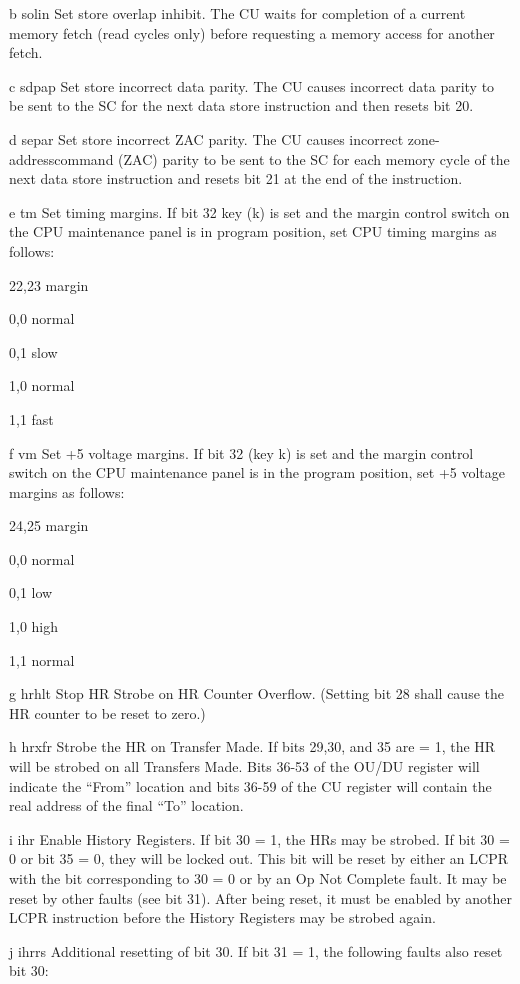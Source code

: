 b solin Set store overlap inhibit. The CU waits for completion of a current
memory fetch (read cycles only) before requesting a memory access for another
fetch.

c sdpap Set store incorrect data parity. The CU causes incorrect data parity to
be sent to the SC for the next data store instruction and then resets bit 20.

d separ Set store incorrect ZAC parity. The CU causes incorrect
zone-addresscommand (ZAC) parity to be sent to the SC for each memory cycle of
the next data store instruction and resets bit 21 at the end of the
instruction.

e tm Set timing margins. If bit 32 key (k) is set and the margin control switch
on the CPU maintenance panel is in program position, set CPU timing margins as
follows:

22,23 margin

0,0 normal

0,1 slow

1,0 normal

1,1 fast

f vm Set +5 voltage margins. If bit 32 (key k) is set and the margin control
switch on the CPU maintenance panel is in the program position, set +5 voltage
margins as follows:

24,25 margin

0,0 normal

0,1 low

1,0 high

1,1 normal

g hrhlt Stop HR Strobe on HR Counter Overflow. (Setting bit 28 shall cause the
HR counter to be reset to zero.)

h hrxfr Strobe the HR on Transfer Made. If bits 29,30, and 35 are = 1, the HR
will be strobed on all Transfers Made. Bits 36-53 of the OU/DU register will
indicate the {``}From'' location and bits 36-59 of the CU register will contain
the real address of the final {``}To'' location.

i ihr Enable History Registers. If bit 30 = 1, the HRs may be strobed. If bit
30 = 0 or bit 35 = 0, they will be locked out. This bit will be reset by either
an LCPR with the bit corresponding to 30 = 0 or by an Op Not Complete fault. It
may be reset by other faults (see bit 31). After being reset, it must be
enabled by another LCPR instruction before the History Registers may be strobed
again.

j ihrrs Additional resetting of bit 30. If bit 31 = 1, the following faults
also reset bit 30:

